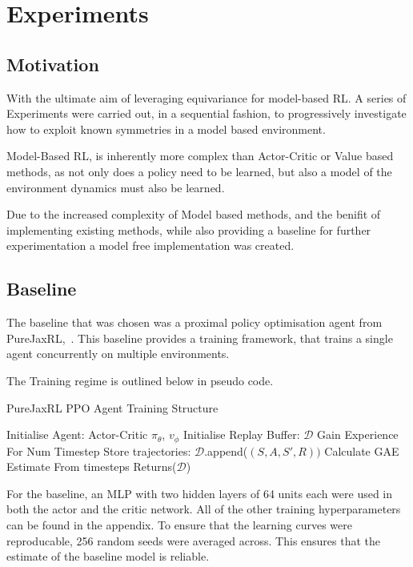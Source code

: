 \chapter{Experiments}
\section{Motivation}
With the ultimate aim of leveraging equivariance for model-based RL. A series of Experiments were carried out, in a sequential fashion, to progressively investigate how to exploit known symmetries in a model based environment.

Model-Based RL, is inherently more complex than Actor-Critic or Value based methods, as not only does a policy need to be learned, but also a model of the environment dynamics must also be learned.

Due to the increased complexity of Model based methods, and the benifit of implementing existing methods, while also providing a baseline for further experimentation a model free implementation was created.

\section{Baseline}
The baseline that was chosen was a proximal policy optimisation agent from PureJaxRL,~\cite{lu2022discovered}. This baseline provides a training framework, that trains a single agent concurrently on multiple environments.

The Training regime is outlined below in pseudo code.
\begin{algorithm}
	\caption{PureJaxRL PPO Agent Training Structure}
	\begin{algorithmic}
		\State Initialise Agent: Actor-Critic $\pi_\theta$, $v_\phi$
		\State Initialise Replay Buffer: $\mathcal{D}$
		\State Gain Experience For Num Timestep
		\State Store trajectories: $\mathcal{D}$.append($(S, A, S', R))$
		\State Calculate GAE Estimate From timesteps
		\EndFor
		\EndFor
		\State Returns($\mathcal{D}$)

	\end{algorithmic}
\end{algorithm}

For the baseline, an MLP with two hidden layers of 64 units each were used in both the actor and the critic network. All of the other training hyperparameters can be found in the appendix. To ensure that the learning curves were reproducable, 256 random seeds were averaged across. This ensures that the estimate of the baseline model is reliable.

